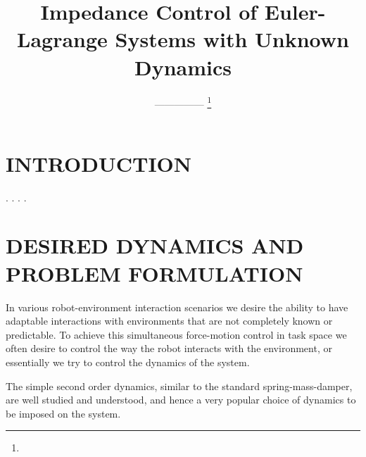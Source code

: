 \documentclass[letterpaper, 10 pt, conference]{ieeeconf}  %
\title{\LARGE \bf
Impedance Control of Euler-Lagrange Systems with Unknown Dynamics
}
\author{---------------%
 \thanks{ 
       {\tt\small }}
}
\newcommand{\RomanNumeralCaps}[1]
    {\MakeUppercase{\romannumeral #1}}
\begin{document}
\maketitle
\thispagestyle{empty}
\pagestyle{empty}
\setlength{\belowcaptionskip}{-10pt} 


\begin{abstract}

\end{abstract}
\section{INTRODUCTION}

.
.
.
.



\section{DESIRED DYNAMICS AND PROBLEM FORMULATION}


In various robot-environment interaction scenarios we desire the ability to have adaptable interactions with environments that are not completely known or predictable.
To achieve this simultaneous force-motion control in task space we often desire to control the way the robot interacts with the environment, or essentially we try to control the dynamics of the system.

The simple second order dynamics, similar to the standard spring-mass-damper, are well studied and understood, and hence a very popular choice of dynamics to be imposed on the system.
\end{document}
